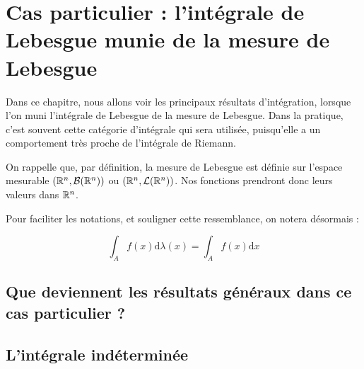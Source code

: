 \documentclass[../integ-proba.tex]{subfiles}
\begin{document}
    \chapter{Cas particulier : l'intégrale de Lebesgue munie de la mesure de Lebesgue}
    \label{ch:int_lebesgue}

    Dans ce chapitre, nous allons voir les principaux résultats d'intégration, lorsque l'on muni l'intégrale de Lebesgue de la mesure de Lebesgue.
    Dans la pratique, c'est souvent cette catégorie d'intégrale qui sera utilisée, puisqu'elle a un comportement très proche de l'intégrale de Riemann.

    On rappelle que, par définition, la mesure de Lebesgue est définie sur l'espace mesurable $\left(\mathbb{R}^n, \mathcal{B}(\mathbb{R}^n)\right)$ ou $\left(\mathbb{R}^n, \mathcal{L}(\mathbb{R}^n)\right)$.
    Nos fonctions prendront donc leurs valeurs dans $\mathbb{R}^n$.

    Pour faciliter les notations, et souligner cette ressemblance, on notera désormais :

    \begin{displaymath}
        \int_A f(x)\text{d}\lambda(x) = \int_A f(x)\text{d}x
    \end{displaymath}

    \section{Que deviennent les résultats généraux dans ce cas particulier ?}

    \section{L'intégrale indéterminée}



\end{document}
